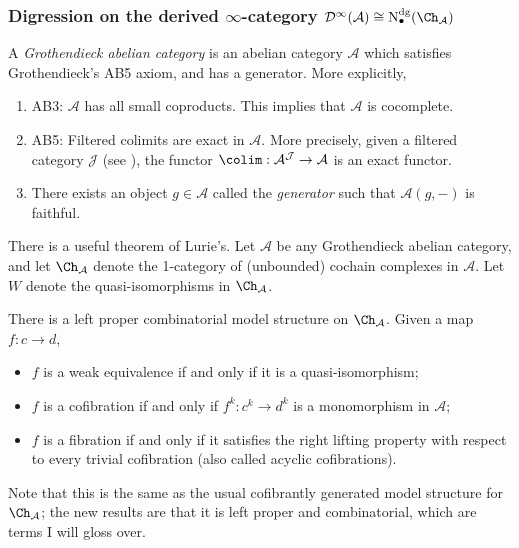 \subsubsection{Digression on the derived $\infty $-category $\mathcal{D} ^{\infty } (\mathcal{A} )\cong \mathrm{N} ^{\mathrm{dg} } _{\bullet} (\Ch_{\mathcal{A} } )$}

\begin{definition}\label{dfn:6-1-5}
	A \emph{Grothendieck abelian category} is an abelian category $\mathcal{A} $ which satisfies Grothendieck's AB5 axiom, and has a generator. More explicitly,
	\begin{enumerate}
		\item AB3: $\mathcal{A} $ has all small coproducts. This implies that $\mathcal{A} $ is cocomplete.
		\item AB5: Filtered colimits are exact in $\mathcal{A} $. More precisely, given a filtered category $\mathcal{J} $ (see \cite{ml}), the functor $\colim : \mathcal{A} ^{\mathcal{J} }  \to \mathcal{A} $ is an exact functor.
		\item There exists an object $g\in \mathcal{A} $ called the \emph{generator} such that $\mathcal{A} (g,-)$ is faithful.
	\end{enumerate}
\end{definition}

There is a useful theorem of Lurie's. Let $\mathcal{A} $ be any Grothendieck abelian category, and let $\Ch_{\mathcal{A} }$ denote the 1-category of (unbounded) cochain complexes in $\mathcal{A} $. Let $W$ denote the quasi-isomorphisms in $\Ch_{\mathcal{A} }$.

\begin{proposition}[Lurie]\label{prp:6-1-6}
	There is a left proper combinatorial model structure on $\Ch_{\mathcal{A} }$. Given a map $f : c \to d$,
	\begin{itemize}
		\item $f$ is a weak equivalence if and only if it is a quasi-isomorphism;
		\item $f$ is a cofibration if and only if $f^k : c^k \to d^k$ is a monomorphism in $\mathcal{A} $;
		\item $f$ is a fibration if and only if it satisfies the right lifting property with respect to every trivial cofibration (also called acyclic cofibrations).
	\end{itemize}
\end{proposition}

Note that this is the same as the usual cofibrantly generated model structure for $\Ch_{\mathcal{A} } $; the new results are that it is left proper and combinatorial, which are terms I will gloss over.

